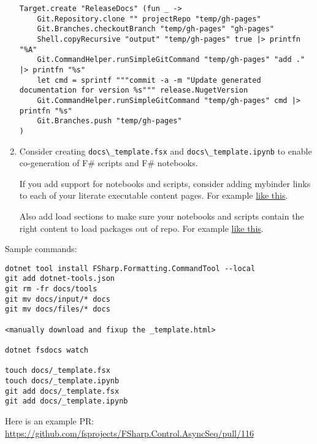 \documentclass{article}
\begin{document}
\begin{enumerate}
\begin{lstlisting}
Target.create "ReleaseDocs" (fun _ ->
    Git.Repository.clone "" projectRepo "temp/gh-pages"
    Git.Branches.checkoutBranch "temp/gh-pages" "gh-pages"
    Shell.copyRecursive "output" "temp/gh-pages" true |> printfn "%A"
    Git.CommandHelper.runSimpleGitCommand "temp/gh-pages" "add ." |> printfn "%s"
    let cmd = sprintf """commit -a -m "Update generated documentation for version %s""" release.NugetVersion
    Git.CommandHelper.runSimpleGitCommand "temp/gh-pages" cmd |> printfn "%s"
    Git.Branches.push "temp/gh-pages"
)

\end{lstlisting}

\item 

Consider creating \texttt{docs{\textbackslash}\_template.fsx} and \texttt{docs{\textbackslash}\_template.ipynb} to enable co-generation of F\# scripts and F\# notebooks.


If you add support for notebooks and scripts, consider adding mybinder links to each of your literate executable content pages. For example \href{https://github.com/fsprojects/FSharp.Formatting/blob/master/docs/literate.fsx\#L19}{like this}.


Also add load sections to make sure your notebooks and scripts contain the right content to load packages out of repo.  For example \href{https://github.com/fsprojects/FSharp.Formatting/blob/master/docs/literate.fsx\#L1}{like this}.

\end{enumerate}



Sample commands:
\begin{lstlisting}
dotnet tool install FSharp.Formatting.CommandTool --local
git add dotnet-tools.json   
git rm -fr docs/tools
git mv docs/input/* docs
git mv docs/files/* docs

<manually download and fixup the _template.html>

dotnet fsdocs watch

touch docs/_template.fsx
touch docs/_template.ipynb
git add docs/_template.fsx
git add docs/_template.ipynb

\end{lstlisting}


Here is an example PR: \href{https://github.com/fsprojects/FSharp.Control.AsyncSeq/pull/116}{https://github.com/fsprojects/FSharp.Control.AsyncSeq/pull/116}
\end{document}
